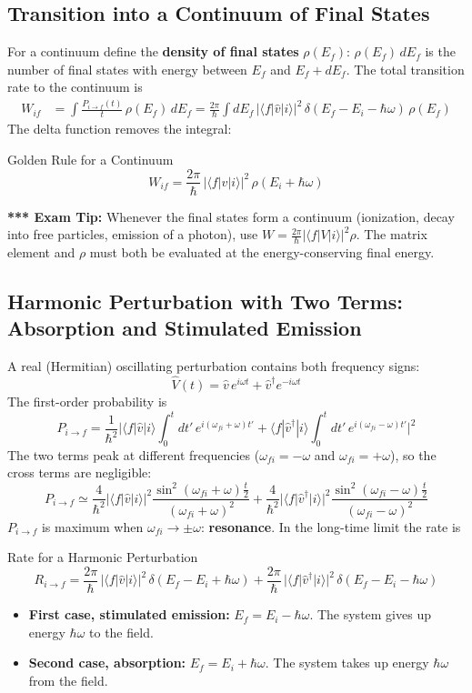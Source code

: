 \documentclass[11pt,a4paper]{article}
\begin{document}
\subsection{Transition into a Continuum of Final States}
For a continuum define the \textbf{density of final states} $\rho(E_f)$: $\rho(E_f)\,dE_f$ is the number of final states with energy between $E_f$ and $E_f+dE_f$. The total transition rate to the continuum is
\begin{align*}
W_{if}&=\int\frac{P_{i\to f}(t)}t\,\rho(E_f)\,dE_f
=\frac{2\pi}\hbar\int dE_f\,|\langle f|\hat v|i\rangle|^2\,\delta(E_f-E_i-\hbar\omega)\,\rho(E_f)
\end{align*}
The delta function removes the integral:
\begin{thm}{Golden Rule for a Continuum}
\[
W_{if}=\frac{2\pi}\hbar\,|\langle f|\hat v|i\rangle|^2\,\rho(E_i+\hbar\omega)
\]
\end{thm}
\textbf{*** Exam Tip:} Whenever the final states form a continuum (ionization, decay into free particles, emission of a photon), use $W=\frac{2\pi}\hbar|\langle f|V|i\rangle|^2\rho$. The matrix element and $\rho$ must both be evaluated at the energy-conserving final energy.

\subsection{Harmonic Perturbation with Two Terms: Absorption and Stimulated Emission}
A real (Hermitian) oscillating perturbation contains both frequency signs:
\[
\hat V(t)=\hat v\,e^{i\omega t}+\hat v^\dagger e^{-i\omega t}
\]
The first-order probability is
\[
P_{i\to f}=\frac1{\hbar^2}\Big|\langle f|\hat v|i\rangle\int_0^tdt'\,e^{i(\omega_{fi}+\omega)t'}+\langle f|\hat v^\dagger|i\rangle\int_0^tdt'\,e^{i(\omega_{fi}-\omega)t'}\Big|^2
\]
The two terms peak at different frequencies ($\omega_{fi}=-\omega$ and $\omega_{fi}=+\omega$), so the cross terms are negligible:
\[
P_{i\to f}\simeq\frac4{\hbar^2}|\langle f|\hat v|i\rangle|^2\frac{\sin^2(\omega_{fi}+\omega)\frac t2}{(\omega_{fi}+\omega)^2}
+\frac4{\hbar^2}|\langle f|\hat v^\dagger|i\rangle|^2\frac{\sin^2(\omega_{fi}-\omega)\frac t2}{(\omega_{fi}-\omega)^2}
\]
$P_{i\to f}$ is maximum when $\omega_{fi}\to\pm\omega$: \textbf{resonance}. In the long-time limit the rate is
\begin{thm}{Rate for a Harmonic Perturbation}
\[
R_{i\to f}=\frac{2\pi}\hbar\,|\langle f|\hat v|i\rangle|^2\,\delta(E_f-E_i+\hbar\omega)+\frac{2\pi}\hbar\,|\langle f|\hat v^\dagger|i\rangle|^2\,\delta(E_f-E_i-\hbar\omega)
\]
\end{thm}
\begin{itemize}
    \item \textbf{First case, stimulated emission:} $E_f=E_i-\hbar\omega$. The system gives up energy $\hbar\omega$ to the field.
    \item \textbf{Second case, absorption:} $E_f=E_i+\hbar\omega$. The system takes up energy $\hbar\omega$ from the field.
\end{itemize}
\end{document}

